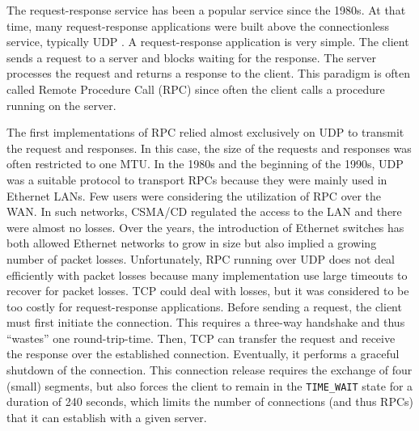 The request-response service has been a popular service since the 1980s.  At that time, many request-response applications were built above the connectionless service, typically UDP \cite{Birrell_RPC:1984}. A request-response application is very simple. The client sends a request to a server and blocks waiting for the response. The server processes the request and returns a response to the client. This paradigm is often called Remote Procedure Call (RPC) since often the client calls a procedure running on the server. 

The first implementations of RPC relied almost exclusively on UDP to transmit the request and responses. In this case, the size of the requests and responses was often restricted to one MTU. In the 1980s and the beginning of the 1990s, UDP was a suitable protocol to transport RPCs because they were mainly used in Ethernet LANs. Few users were considering the utilization of RPC over the WAN. In such networks, CSMA/CD regulated the access to the LAN and there were almost no losses. Over the years, the introduction of Ethernet switches has both allowed Ethernet networks to grow in size but also implied a growing number of packet losses. Unfortunately, RPC running over UDP does not deal efficiently with packet losses because many implementation use large timeouts to recover for packet losses. TCP could deal with losses, but it was considered to be too costly for request-response applications. Before sending a request, the client must first initiate the connection. This requires a three-way handshake and thus ``wastes'' one round-trip-time. Then, TCP can transfer the request and receive the response over the established connection. Eventually, it performs a graceful shutdown of the connection. This connection release requires the exchange of four (small) segments, but also forces the client to remain in the \texttt{TIME\_WAIT} state for a duration of 240 seconds, which limits the number of connections (and thus RPCs) that it can establish with a given server.

